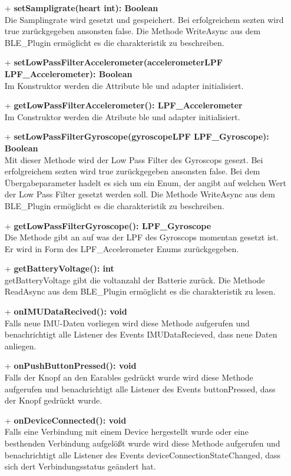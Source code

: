 \documentclass[a4paper,12pt]{article}
\begin{document}
\begin{itemize}
	\item[+] \textbf{setSampligrate(heart int): Boolean}\\Die Samplingrate wird gesetzt und gespeichert. Bei erfolgreichem sezten wird true zurückgegeben ansonsten false. Die Methode WriteAsync aus dem BLE\_Plugin ermöglicht es die charakteristik zu beschreiben.
	\item[+] \textbf{setLowPassFilterAccelerometer(accelerometerLPF LPF\_Accelerometer): Boolean}\\ Im Konstruktor werden die Attribute ble und adapter initialisiert.
	\item[+] \textbf{getLowPassFilterAccelerometer(): LPF\_Accelerometer}\\ Im Construktor werden die Atribute ble und adapter initialisiert.
	\item[+] \textbf{setLowPassFilterGyroscope(gyroscopeLPF LPF\_Gyroscope): Boolean}\\ Mit dieser Methode wird der Low Pass Filter des Gyroscops gesezt. Bei erfolgreichem sezten wird true zurückgegeben ansonsten false. Bei dem Übergabeparameter hadelt es sich um ein Enum, der angibt auf welchen Wert der Low Pass Filter gesetzt werden soll. Die Methode WriteAsync aus dem BLE\_Plugin ermöglicht es die charakteristik zu beschreiben.
	\item[+] \textbf{getLowPassFilterGyroscope(): LPF\_Gyroscope}\\Die Methode gibt an auf was der LPF des Gyroscops momentan gesetzt ist. Er wird in Form des LPF\_Accelerometer Enums zurückgegeben. 
	\item[+] \textbf{getBatteryVoltage(): int}\\ getBatteryVoltage gibt die voltanzahl der Batterie zurück. Die Methode ReadAsync aus dem BLE\_Plugin ermöglicht es die charakteristik zu lesen.
	\item[+] \textbf{onIMUDataRecived(): void}\\Falls neue IMU-Daten vorliegen wird diese Methode aufgerufen und benachrichtigt alle Listener des Events IMUDataRecieved, dass neue Daten anliegen.
	\item[+] \textbf{onPushButtonPressed(): void}\\ Falls der Knopf an den Earables gedrückt wurde wird diese Methode aufgerufen und benachrichtigt alle Listener des Events buttonPressed, dass der Knopf gedrückt wurde.
	\item[+] \textbf{onDeviceConnected(): void}\\ Falls eine Verbindung mit einem Device hergestellt wurde oder eine besthenden Verbindung aufgelößt wurde wird diese Methode aufgerufen und benachrichtigt alle Listener des Events deviceConnectionStateChanged, dass sich dert Verbindungsstatus geändert hat.
\end{itemize}
\end{document}

